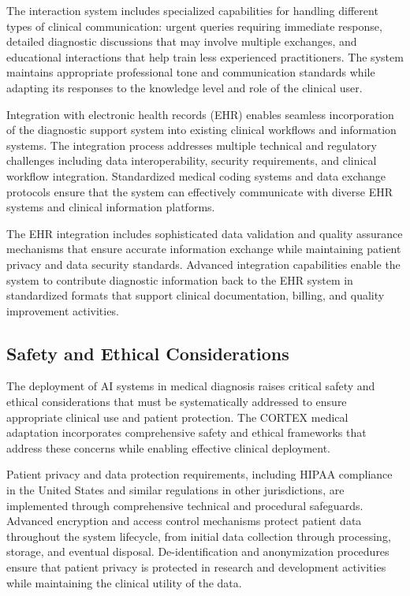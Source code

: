 The interaction system includes specialized capabilities for handling different types of clinical communication: urgent queries requiring immediate response, detailed diagnostic discussions that may involve multiple exchanges, and educational interactions that help train less experienced practitioners. The system maintains appropriate professional tone and communication standards while adapting its responses to the knowledge level and role of the clinical user.

Integration with electronic health records (EHR) enables seamless incorporation of the diagnostic support system into existing clinical workflows and information systems. The integration process addresses multiple technical and regulatory challenges including data interoperability, security requirements, and clinical workflow integration. Standardized medical coding systems and data exchange protocols ensure that the system can effectively communicate with diverse EHR systems and clinical information platforms.

The EHR integration includes sophisticated data validation and quality assurance mechanisms that ensure accurate information exchange while maintaining patient privacy and data security standards. Advanced integration capabilities enable the system to contribute diagnostic information back to the EHR system in standardized formats that support clinical documentation, billing, and quality improvement activities.

\subsection{Safety and Ethical Considerations}

The deployment of AI systems in medical diagnosis raises critical safety and ethical considerations that must be systematically addressed to ensure appropriate clinical use and patient protection. The CORTEX medical adaptation incorporates comprehensive safety and ethical frameworks that address these concerns while enabling effective clinical deployment.

Patient privacy and data protection requirements, including HIPAA compliance in the United States and similar regulations in other jurisdictions, are implemented through comprehensive technical and procedural safeguards. Advanced encryption and access control mechanisms protect patient data throughout the system lifecycle, from initial data collection through processing, storage, and eventual disposal. De-identification and anonymization procedures ensure that patient privacy is protected in research and development activities while maintaining the clinical utility of the data.

